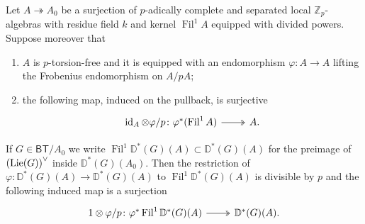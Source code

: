 \begin{lem}\label{lem:A2Kisin}
	Let $A \twoheadrightarrow A_0$ be a surjection of $p$-adically complete
	and separated local $\mathbb{Z}_{p}$-algebras with residue field
	$k$ and kernel $\operatorname{Fil}^1 A$ equipped with divided powers.
	Suppose moreover that
\begin{enumerate}
	\item $A$ is $p$-torsion-free and it is equipped with an endomorphism
		$\varphi\colon A \to A$ lifting the Frobenius endomorphism on $A/pA$;
		
	\item the following map, induced on the pullback, is surjective
		\begin{equation*}
		\begin{tikzcd}
			\id_{ A } \otimes \varphi/p \colon
			\varphi^*(\operatorname{Fil}^1 A)
			\arrow[r, "", twoheadrightarrow] &
			A
		.\end{tikzcd}
		\end{equation*}
\end{enumerate}
	If $G \in \mathsf{BT}/A_0$ we write $\operatorname{Fil}^1 \mathbb{D}^*(G)(A) \subset \mathbb{D}^*(G)(A)$
	for the preimage of $\left( \operatorname{Lie}(G) \right)^\vee$ inside $\mathbb{D}^*(G)(A_0)$.
	Then the restriction of $\varphi\colon \mathbb{D}^*(G)(A) \to \mathbb{D}^*(G)(A)$
	to $\operatorname{Fil}^1 \mathbb{D}^*(G)(A)$ is divisible by $p$ and the following induced map
	is a surjection
	\begin{equation*}
	\begin{tikzcd}
		1 \otimes \varphi/p \colon
		\varphi^*\operatorname{Fil}^1 \mathbb{D}^*(G)(A)
		\arrow[r, "", twoheadrightarrow] &
		\mathbb{D}^*(G)(A)
	.\end{tikzcd}
	\end{equation*}
\end{lem} 


